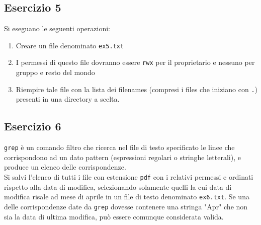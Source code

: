 \documentclass{article}
\def\code#1{\texttt{#1}}
\begin{document}
\subsection*{Esercizio 5}
Si eseguano le seguenti operazioni:
\begin{enumerate}
\item Creare un file denominato \code{ex5.txt}
\item I permessi di questo file dovranno essere \code{rwx} per il proprietario e nessuno per gruppo e resto del mondo
\item Riempire tale file con la lista dei filenames (compresi i files che iniziano con \code{.}) presenti in una directory a scelta.
\end{enumerate}

\subsection*{Esercizio 6}
\code{grep} è un comando filtro che ricerca nel file di testo specificato le linee che corrispondono ad un dato pattern (espressioni regolari o stringhe letterali), e produce un elenco delle corrispondenze.\\

Si salvi l'elenco di tutti i file con estensione \code{pdf} con i relativi permessi e ordinati rispetto alla data di modifica, selezionando solamente quelli la cui data di modifica risale ad mese di aprile in un file di testo denominato \code{ex6.txt}. Se una delle corrispondenze date da \code{grep} dovesse contenere una stringa "Apr" che non sia la data di ultima modifica, può essere comunque considerata valida.
\end{document}
